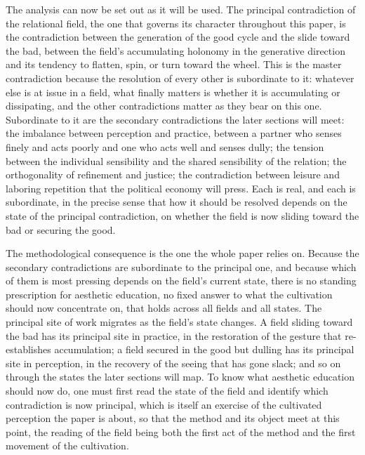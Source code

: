 The analysis can now be set out as it will be used. The principal contradiction of the relational field, the one that governs its character throughout this paper, is the contradiction between the generation of the good cycle and the slide toward the bad, between the field's accumulating holonomy in the generative direction and its tendency to flatten, spin, or turn toward the wheel. This is the master contradiction because the resolution of every other is subordinate to it: whatever else is at issue in a field, what finally matters is whether it is accumulating or dissipating, and the other contradictions matter as they bear on this one. Subordinate to it are the secondary contradictions the later sections will meet: the imbalance between perception and practice, between a partner who senses finely and acts poorly and one who acts well and senses dully; the tension between the individual sensibility and the shared sensibility of the relation; the orthogonality of refinement and justice; the contradiction between leisure and laboring repetition that the political economy will press. Each is real, and each is subordinate, in the precise sense that how it should be resolved depends on the state of the principal contradiction, on whether the field is now sliding toward the bad or securing the good.

The methodological consequence is the one the whole paper relies on. Because the secondary contradictions are subordinate to the principal one, and because which of them is most pressing depends on the field's current state, there is no standing prescription for aesthetic education, no fixed answer to what the cultivation should now concentrate on, that holds across all fields and all states. The principal site of work migrates as the field's state changes. A field sliding toward the bad has its principal site in practice, in the restoration of the gesture that re-establishes accumulation; a field secured in the good but dulling has its principal site in perception, in the recovery of the seeing that has gone slack; and so on through the states the later sections will map. To know what aesthetic education should now do, one must first read the state of the field and identify which contradiction is now principal, which is itself an exercise of the cultivated perception the paper is about, so that the method and its object meet at this point, the reading of the field being both the first act of the method and the first movement of the cultivation.

